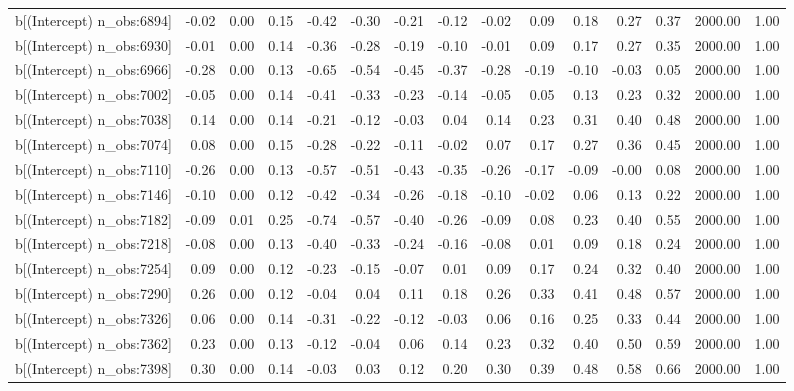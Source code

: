 \begin{table}[ht]
\begin{tabular}{rrrrrrrrrrrrrrr}
  b[(Intercept) n\_obs:6894] & -0.02 & 0.00 & 0.15 & -0.42 & -0.30 & -0.21 & -0.12 & -0.02 & 0.09 & 0.18 & 0.27 & 0.37 & 2000.00 & 1.00 \\ 
  b[(Intercept) n\_obs:6930] & -0.01 & 0.00 & 0.14 & -0.36 & -0.28 & -0.19 & -0.10 & -0.01 & 0.09 & 0.17 & 0.27 & 0.35 & 2000.00 & 1.00 \\ 
  b[(Intercept) n\_obs:6966] & -0.28 & 0.00 & 0.13 & -0.65 & -0.54 & -0.45 & -0.37 & -0.28 & -0.19 & -0.10 & -0.03 & 0.05 & 2000.00 & 1.00 \\ 
  b[(Intercept) n\_obs:7002] & -0.05 & 0.00 & 0.14 & -0.41 & -0.33 & -0.23 & -0.14 & -0.05 & 0.05 & 0.13 & 0.23 & 0.32 & 2000.00 & 1.00 \\ 
  b[(Intercept) n\_obs:7038] & 0.14 & 0.00 & 0.14 & -0.21 & -0.12 & -0.03 & 0.04 & 0.14 & 0.23 & 0.31 & 0.40 & 0.48 & 2000.00 & 1.00 \\ 
  b[(Intercept) n\_obs:7074] & 0.08 & 0.00 & 0.15 & -0.28 & -0.22 & -0.11 & -0.02 & 0.07 & 0.17 & 0.27 & 0.36 & 0.45 & 2000.00 & 1.00 \\ 
  b[(Intercept) n\_obs:7110] & -0.26 & 0.00 & 0.13 & -0.57 & -0.51 & -0.43 & -0.35 & -0.26 & -0.17 & -0.09 & -0.00 & 0.08 & 2000.00 & 1.00 \\ 
  b[(Intercept) n\_obs:7146] & -0.10 & 0.00 & 0.12 & -0.42 & -0.34 & -0.26 & -0.18 & -0.10 & -0.02 & 0.06 & 0.13 & 0.22 & 2000.00 & 1.00 \\ 
  b[(Intercept) n\_obs:7182] & -0.09 & 0.01 & 0.25 & -0.74 & -0.57 & -0.40 & -0.26 & -0.09 & 0.08 & 0.23 & 0.40 & 0.55 & 2000.00 & 1.00 \\ 
  b[(Intercept) n\_obs:7218] & -0.08 & 0.00 & 0.13 & -0.40 & -0.33 & -0.24 & -0.16 & -0.08 & 0.01 & 0.09 & 0.18 & 0.24 & 2000.00 & 1.00 \\ 
  b[(Intercept) n\_obs:7254] & 0.09 & 0.00 & 0.12 & -0.23 & -0.15 & -0.07 & 0.01 & 0.09 & 0.17 & 0.24 & 0.32 & 0.40 & 2000.00 & 1.00 \\ 
  b[(Intercept) n\_obs:7290] & 0.26 & 0.00 & 0.12 & -0.04 & 0.04 & 0.11 & 0.18 & 0.26 & 0.33 & 0.41 & 0.48 & 0.57 & 2000.00 & 1.00 \\ 
  b[(Intercept) n\_obs:7326] & 0.06 & 0.00 & 0.14 & -0.31 & -0.22 & -0.12 & -0.03 & 0.06 & 0.16 & 0.25 & 0.33 & 0.44 & 2000.00 & 1.00 \\ 
  b[(Intercept) n\_obs:7362] & 0.23 & 0.00 & 0.13 & -0.12 & -0.04 & 0.06 & 0.14 & 0.23 & 0.32 & 0.40 & 0.50 & 0.59 & 2000.00 & 1.00 \\ 
  b[(Intercept) n\_obs:7398] & 0.30 & 0.00 & 0.14 & -0.03 & 0.03 & 0.12 & 0.20 & 0.30 & 0.39 & 0.48 & 0.58 & 0.66 & 2000.00 & 1.00 \\ 

\end{tabular}
\end{table}
